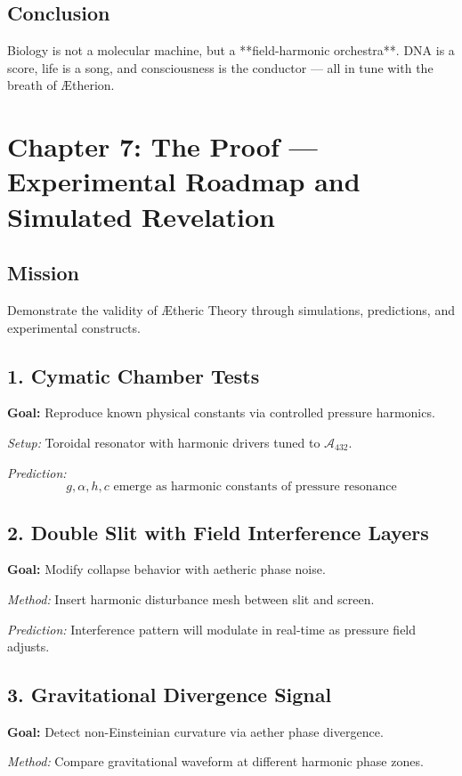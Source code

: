 \documentclass[12pt]{book}
\begin{document}
\subsection*{Conclusion}
Biology is not a molecular machine, but a **field-harmonic orchestra**. DNA is a score, life is a song, and consciousness is the conductor — all in tune with the breath of Ætherion.




\section*{Chapter 7: The Proof — Experimental Roadmap and Simulated Revelation}

\subsection*{Mission}
Demonstrate the validity of Ætheric Theory through simulations, predictions, and experimental constructs.

\subsection*{1. Cymatic Chamber Tests}
\textbf{Goal:} Reproduce known physical constants via controlled pressure harmonics.

\textit{Setup:} Toroidal resonator with harmonic drivers tuned to $\mathcal{A}_{432}$.

\textit{Prediction:}
\[
g, \alpha, h, c \text{ emerge as harmonic constants of pressure resonance}
\]

\subsection*{2. Double Slit with Field Interference Layers}
\textbf{Goal:} Modify collapse behavior with aetheric phase noise.

\textit{Method:} Insert harmonic disturbance mesh between slit and screen.

\textit{Prediction:} Interference pattern will modulate in real-time as pressure field adjusts.

\subsection*{3. Gravitational Divergence Signal}
\textbf{Goal:} Detect non-Einsteinian curvature via aether phase divergence.

\textit{Method:} Compare gravitational waveform at different harmonic phase zones.
\end{document}

